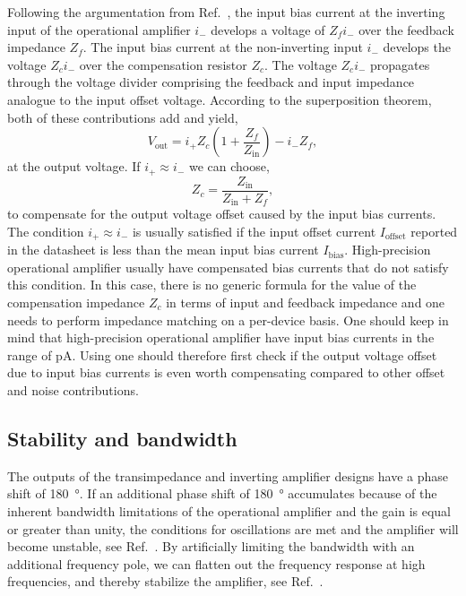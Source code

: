 Following the argumentation from Ref.~\cite[p.~383]{Terrel96}, the input bias current at the inverting input of the operational amplifier $i_-$ develops a voltage of $Z_fi_-$ over the feedback impedance $Z_f$.
The input bias current at the non-inverting input $i_-$ develops the voltage $Z_ci_-$ over the compensation resistor $Z_c$.
The voltage $Z_ci_-$ propagates through the voltage divider comprising the feedback and input impedance analogue to the input offset voltage.
According to the superposition theorem, both of these contributions add and yield,
\begin{equation}
	V_\text{out}=i_+Z_c\left(1+\frac{Z_f}{Z_\text{in}}\right)-i_-Z_f
	\label{eq:input_bias_current},
\end{equation}
at the output voltage.
If $i_+\approx i_-$ we can choose,
\begin{equation}
	Z_c=\frac{Z_\text{in}}{Z_\text{in}+Z_f},
\end{equation}
 to compensate for the output voltage offset caused by the input bias currents.
The condition $i_+\approx i_-$ is usually satisfied if the input offset current $I_\text{offset}$ reported in the datasheet is less than the mean input bias current $I_\text{bias}$.
High-precision operational amplifier usually have compensated bias currents that do not satisfy this condition.
In this case, there is no generic formula for the value of the compensation impedance $Z_c$ in terms of input and feedback impedance and one needs to perform impedance matching on a per-device basis.
One should keep in mind that high-precision operational amplifier have input bias currents in the range of \si{\pico\ampere}.
Using  one should therefore first check if the output voltage offset due to input bias currents is even worth compensating compared to other offset and noise contributions.

\subsection{Stability and bandwidth}\label{sec:opamp_stability_bandwidth}

The outputs of the transimpedance and inverting amplifier designs have a phase shift of \SI{180}{\degree}.
If an additional phase shift of \SI{180}{\degree} accumulates because of the inherent bandwidth limitations of the operational amplifier and the gain is equal or greater than unity, the conditions for oscillations are met and the amplifier will become unstable, see Ref.~\cite[p.~395]{Terrel96}.
By artificially limiting the bandwidth with an additional frequency pole, we can flatten out the frequency response at high frequencies, and thereby stabilize the amplifier, see Ref.~\cite[p.~184]{Kay12}.

